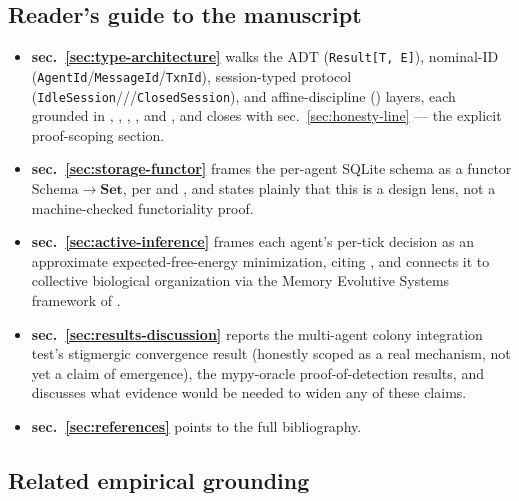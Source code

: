 \documentclass[
  english,
]{article}
\providecommand{\tightlist}{%
  \setlength{\itemsep}{0pt}\setlength{\parskip}{0pt}}
\theoremstyle{definition}
\begin{document}
\subsection{Reader's guide to the
manuscript}\label{readers-guide-to-the-manuscript}

\begin{itemize}
\tightlist
\item
  \textbf{sec.~\ref{sec:type-architecture}} walks the ADT
  (\texttt{Result{[}T,\ E{]}}), nominal-ID
  (\texttt{AgentId}/\texttt{MessageId}/\texttt{TxnId}), session-typed
  protocol
  (\texttt{IdleSession}///\texttt{ClosedSession}),
  and affine-discipline () layers, each
  grounded in \citet{wadler2015propositions}, \citet{pierce2002types},
  \citet{milner1978theory}, \citet{honda1998language}, and
  \citet{jung2018rustbelt}, and closes with sec.~\ref{sec:honesty-line}
  --- the explicit proof-scoping section.
\item
  \textbf{sec.~\ref{sec:storage-functor}} frames the per-agent SQLite
  schema as a functor \(\mathrm{Schema} \to \mathbf{Set}\), per
  \citet{fong2018seven} and \citet{spivak2012ologs}, and states plainly
  that this is a design lens, not a machine-checked functoriality proof.
\item
  \textbf{sec.~\ref{sec:active-inference}} frames each agent's per-tick
  decision as an approximate expected-free-energy minimization, citing
  \citet{friston2005theory}, and connects it to collective biological
  organization via the Memory Evolutive Systems framework of
  \citep{ehresmann2007memory}.
\item
  \textbf{sec.~\ref{sec:results-discussion}} reports the multi-agent
  colony integration test's stigmergic convergence result (honestly
  scoped as a real mechanism, not yet a claim of emergence), the
  mypy-oracle proof-of-detection results, and discusses what evidence
  would be needed to widen any of these claims.
\item
  \textbf{sec.~\ref{sec:references}} points to the full bibliography.
\end{itemize}

\subsection{Related empirical
grounding}\label{related-empirical-grounding}
\end{document}
